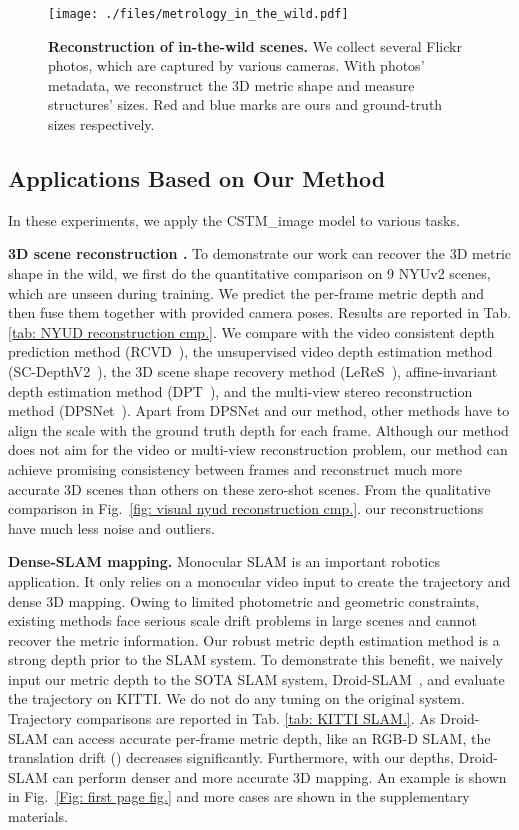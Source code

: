 \begin{figure}[!bth]
\centering
\texttt{[image: ./files/metrology\_in\_the\_wild.pdf]}
\vspace{-2 em}
\caption{\textbf{Reconstruction of in-the-wild scenes.} We collect several Flickr photos, which are captured by various cameras. With photos' metadata, we reconstruct the 3D metric shape and measure structures' sizes. Red and blue marks are ours and ground-truth sizes respectively. }
\label{fig: reconstruction in the wild.}
\vspace{-1em}
\end{figure}


\subsection{Applications Based on Our Method}
In these experiments, we apply the CSTM\_image model to various tasks. 

\noindent\textbf{3D scene reconstruction .}
To demonstrate our work can recover the 3D metric shape in the wild, we first do the quantitative comparison on 9 NYUv2 scenes, which are unseen during training. We predict the per-frame metric depth and then fuse them together with provided camera poses. Results are reported in Tab. \ref{tab: NYUD reconstruction cmp.}. We compare with the video consistent depth prediction method (RCVD~\cite{kopf2021rcvd}), the unsupervised video depth estimation method (SC-DepthV2~\cite{bian2021tpami}), the 3D scene shape recovery method (LeReS~\cite{leres}), affine-invariant depth estimation method (DPT~\cite{ranftl2021vision}), and the multi-view stereo reconstruction method (DPSNet~\cite{im2019dpsnet}). Apart from DPSNet and our method, other methods have to align the scale with the ground truth depth for each frame. Although our method does not aim for the video or multi-view reconstruction problem, our method can achieve promising consistency between frames and reconstruct much more accurate 3D scenes than others on these zero-shot scenes.  From the qualitative comparison in Fig.~\ref{fig: visual nyud reconstruction cmp.}. our reconstructions have much less noise and outliers. 

\noindent\textbf{Dense-SLAM mapping.}
Monocular SLAM is an important robotics application. It only relies on a monocular video input to create the trajectory and dense 3D mapping. Owing to limited photometric and geometric constraints, existing methods face serious scale drift problems in large scenes and cannot recover the metric information. Our robust metric depth estimation method is a strong depth prior to the SLAM system. To demonstrate this benefit,  we naively input our metric depth to the SOTA SLAM system, Droid-SLAM~\cite{teed2021droid}, and evaluate the trajectory on KITTI. We do not do any tuning on the original system. Trajectory comparisons are reported in Tab. \ref{tab: KITTI SLAM.}. As Droid-SLAM can access accurate per-frame metric depth, like an RGB-D SLAM, the translation drift () decreases significantly. Furthermore, with our depths, Droid-SLAM can perform denser and more accurate 3D mapping. An example is shown in Fig.~\ref{Fig: first page fig.} and more cases are shown in the supplementary materials.   

